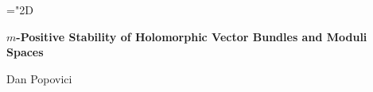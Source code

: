 \documentclass[12pt]{article}
\begin{document}
\mathchardef\mhyphen="2D
\newtheorem{The}{Theorem}[section]
\newtheorem{Lem}[The]{Lemma}
\newtheorem{Prop}[The]{Proposition}
\newtheorem{Cor}[The]{Corollary}
\newtheorem{Rem}[The]{Remark}
\newtheorem{Obs}[The]{Observation}
\newtheorem{SConj}[The]{Standard Conjecture}
\newtheorem{Titre}[The]{\!\!\!\! }
\newtheorem{Conj}[The]{Conjecture}
\newtheorem{Question}[The]{Question}
\newtheorem{Prob}[The]{Problem}
\newtheorem{Def}[The]{Definition}
\newtheorem{Not}[The]{Notation}
\newtheorem{Claim}[The]{Claim}
\newtheorem{Conc}[The]{Conclusion}
\newtheorem{Ex}[The]{Example}
\newtheorem{Fact}[The]{Fact}
\newtheorem{Formula}[The]{Formula}
\newtheorem{Formulae}[The]{Formulae}
\newtheorem{The-Def}[The]{Theorem and Definition}
\newtheorem{Prop-Def}[The]{Proposition and Definition}
\newtheorem{Def-Prop}[The]{Definition and Proposition}
\newtheorem{Lem-Def}[The]{Lemma and Definition}
\newtheorem{Cor-Def}[The]{Corollary and Definition}
\newtheorem{Conc-Def}[The]{Conclusion and Definition}
\newtheorem{Terminology}[The]{Note on terminology}
\newcommand{\C}{\mathbb{C}}
\newcommand{\R}{\mathbb{R}}
\newcommand{\N}{\mathbb{N}}
\newcommand{\Z}{\mathbb{Z}}
\newcommand{\Q}{\mathbb{Q}}
\newcommand{\Proj}{\mathbb{P}}
\newcommand{\Rc}{\mathcal{R}}
\newcommand{\Oc}{\mathcal{O}}
\newcommand{\Vc}{\mathcal{V}}
\newcommand{\Id}{\operatorname{Id}}
\newcommand{\pr}{\operatorname{pr}}
\newcommand{\rk}{\operatorname{rk}}
\newcommand{\del}{\partial}
\newcommand{\delbar}{\bar{\partial}}
\newcommand{\Cdot}{{\raisebox{-0.7ex}[0pt][0pt]{\scalebox{2.0}{$\cdot$}}}}
\newcommand\nilm{\Gamma\backslash G}
\newcommand\frg{{\mathfrak g}}
\newcommand{\fg}{\mathfrak g}
\newcommand{\Oh}{\mathcal{O}}
\newcommand{\Kur}{\operatorname{Kur}}
\newcommand\gc{\frg_\mathbb{C}}
\newcommand\slawek[1]{{\textcolor{red}{#1}}}
\newcommand\dan[1]{{\textcolor{blue}{#1}}}
\newcommand\question[1]{{\textcolor{green}{#1}}}

\begin{center}

  {\Large\bf $m$-Positive Stability of Holomorphic Vector Bundles and Moduli Spaces}


\end{center}


\begin{center}

{\large Dan Popovici}

\end{center}
\end{document}
